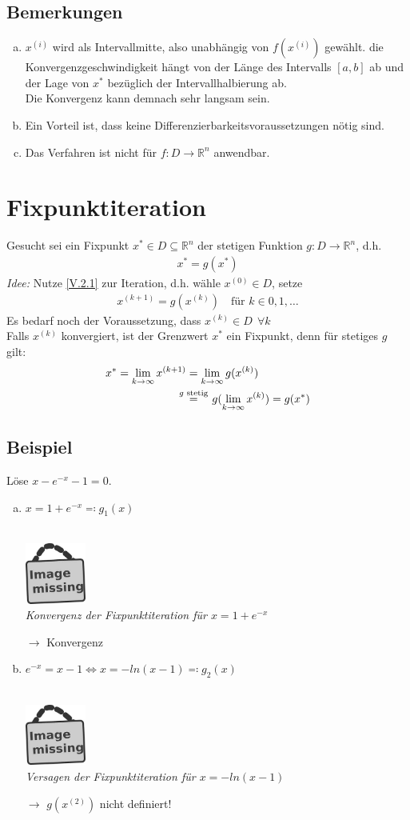 \documentclass[ngerman,fontsize=11pt, paper=a4, parskip=half, titlepage=true, toc=bib]{scrbook}
\newcommand{\R}{\mathds{R}}
\newcommand{\sectione}[1]{\section{#1} \setcounter{equation}{0}}
\newcommand{\imagemissing}[1]{
  \begin{center}~\\
    \centering 
    \includegraphics[width=2cm]{images/image_missing.jpg}\\
    \textit{#1} \\
  \end{center}
}
\begin{document}
  \subsection{Bemerkungen}
  \begin{enumerate}[a)]
  \item $x^{(i)} $ wird als Intervallmitte, also unabhängig von $f(x^{(i)})$
    gewählt. die Konvergenzgeschwindigkeit hängt von der Länge des Intervalls $[a,b]$ ab
    und der Lage von $x^{*}$ bezüglich der Intervallhalbierung ab. \\
    Die Konvergenz kann demnach sehr langsam sein.
  \item Ein Vorteil ist, dass keine Differenzierbarkeitsvoraussetzungen nötig sind.
  \item Das Verfahren ist nicht für $f:D\longrightarrow \R^n$ anwendbar.
  \end{enumerate}
  
  
  \sectione{Fixpunktiteration}
  Gesucht sei ein Fixpunkt $x^{*}\in D\subseteq \R^n$ der stetigen Funktion
  $g:D\rightarrow\R^n$, d.h.
  \begin{gather}
    x^{*} = g(x^{*}) \label{V.2.1}
  \end{gather}
  \textit{Idee:}
  Nutze \eqref{V.2.1} zur Iteration, d.h. wähle $x^{(0)}\in D$,
  setze 
  \begin{gather}
    x^{(k+1)} = g(x^{(k)})  \quad \text{für } k\in 0, 1, \dotsc
    \label{V.2.2}
  \end{gather}
  Es bedarf noch der Voraussetzung, dass $x^{(k)}\in D~~ \forall k$ \\
  Falls $x^{(k)}$ konvergiert, ist der Grenzwert $x^{*}$ ein Fixpunkt,
  denn für stetiges $g$ gilt:
  \begin{align} \nonumber
    x^{*} = \lim_{k\rightarrow \infty}x^{(k+1)} &= \lim_{k\rightarrow \infty}g(x^{(k)}) \\
                                                & \overset{\mathclap{g \text{ stetig}} }{=}\quad g(\lim_{k\rightarrow \infty}x^{(k)}) = g(x^{*})
                                                  \label{V.2.3}
  \end{align}
  
  \subsection{Beispiel}
  Löse $x-e^{-x}-1 = 0$.
  \begin{enumerate}[a)]
  \item $x=1+e^{-x} \eqqcolon g_1(x)$
    \imagemissing{Konvergenz der Fixpunktiteration für $x=1+e^{-x}$}
    $\longrightarrow$ Konvergenz
  \item $e^{-x} = x-1   \Leftrightarrow x= -ln(x-1) \eqqcolon g_2(x)$
    \imagemissing{Versagen der Fixpunktiteration für $x=-ln(x-1)$}
    $\longrightarrow$ $g(x^{(2)}) $ nicht definiert!
  \end{enumerate}
  
\end{document}
